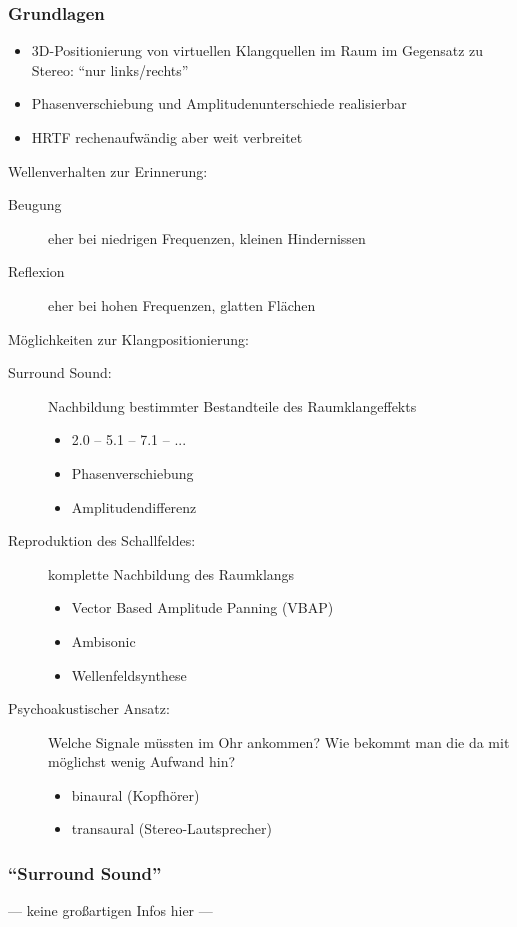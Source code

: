 \documentclass[a4paper, 12pt]{article}
\begin{document}
\subsubsection*{Grundlagen}
\begin{itemize}
  \item 3D-Positionierung von virtuellen Klangquellen im Raum im Gegensatz zu Stereo: ``nur links/rechts''
  \item Phasenverschiebung und Amplitudenunterschiede realisierbar
  \item HRTF rechenaufwändig aber weit verbreitet
\end{itemize}
Wellenverhalten zur Erinnerung:
\begin{description}
  \item[Beugung] eher bei niedrigen Frequenzen, kleinen Hindernissen
  \item[Reflexion] eher bei hohen Frequenzen, glatten Flächen
\end{description}
Möglichkeiten zur Klangpositionierung:
\begin{description}
  \item[Surround Sound:] Nachbildung bestimmter Bestandteile des Raumklangeffekts
    \begin{itemize}
      \item 2.0 -- 5.1 -- 7.1 -- ...
      \item Phasenverschiebung
      \item Amplitudendifferenz
    \end{itemize}
  \item[Reproduktion des Schallfeldes:] komplette Nachbildung des Raumklangs
    \begin{itemize}
      \item Vector Based Amplitude Panning (VBAP)
      \item Ambisonic
      \item Wellenfeldsynthese
    \end{itemize}
  \item[Psychoakustischer Ansatz:] Welche Signale müssten im Ohr ankommen? Wie bekommt man die da mit möglichst wenig Aufwand hin?
    \begin{itemize}
      \item binaural (Kopfhörer)
      \item transaural (Stereo-Lautsprecher)
    \end{itemize}
\end{description}

\subsubsection*{``Surround Sound''}
--- keine großartigen Infos hier ---
\end{document}
